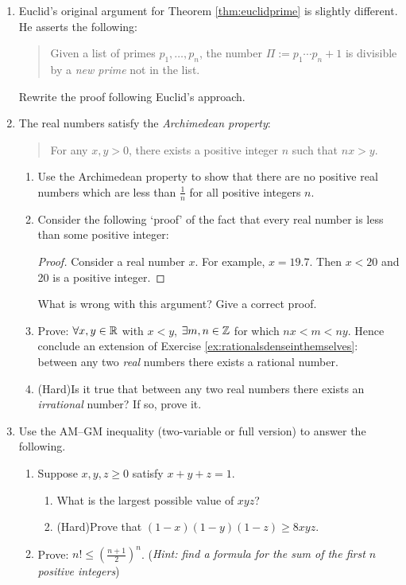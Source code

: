 \begin{exercises}{}{}
\begin{enumerate}
	
	\item Euclid's original argument for Theorem \ref{thm:euclidprime} is slightly different. He asserts the following:
	\begin{quote}
		Given a list of primes $p_1,\ldots,p_n$, the number $\Pi:=p_1\cdots p_n+1$ is divisible by a \emph{new prime} not in the list.
	\end{quote}
	Rewrite the proof following Euclid's approach.
	
	
	\item The real numbers satisfy the \emph{Archimedean property}:
	\begin{quote}
		For any $x,y>0$, there exists a positive integer $n$ such that $nx>y$.
	\end{quote}
	\begin{enumerate}
	  \item Use the Archimedean property to show that there are no positive real numbers which are less than $\frac 1n$ for all positive integers $n$. 
  
  	\item Consider the following `proof' of the fact that every real number is less than some positive integer:
  	\begin{proof}
    	Consider a real number $x$. For example, $x = 19.7$. Then $x<20$ and 20 is a positive integer. 
 		\end{proof}
  	What is wrong with this argument? Give a correct proof.
	
		\item Prove: $\forall x,y\in\mathbb{R}$ with $x<y$, $\exists m,n\in\mathbb{Z}$ for which $nx<m<ny$. Hence conclude an extension of Exercise \ref{ex:rationalsdenseinthemselves}: between any two \emph{real} numbers there exists a rational number.
		
  	\item (Hard)\lstsp Is it true that between any two real numbers there exists an \emph{irrational} number? If so, prove it.
	\end{enumerate}
	
	
	\item Use the AM--GM inequality (two-variable or full version) to answer the following.
	\begin{enumerate}
	  \item Suppose $x,y,z\ge 0$ satisfy $x+y+z=1$.
		\begin{enumerate}
		  \item What is the largest possible value of $xyz$?
	  	\item (Hard)\lstsp Prove that $(1-x)(1-y)(1-z)\ge 8xyz$.
	  \end{enumerate}
    \item Prove: $n! \le \left(\frac{n + 1}{2}\right)^n$. (\emph{Hint: find a formula for the sum of the first $n$ positive integers})
	\end{enumerate}
    

\end{enumerate}
\end{exercises}
